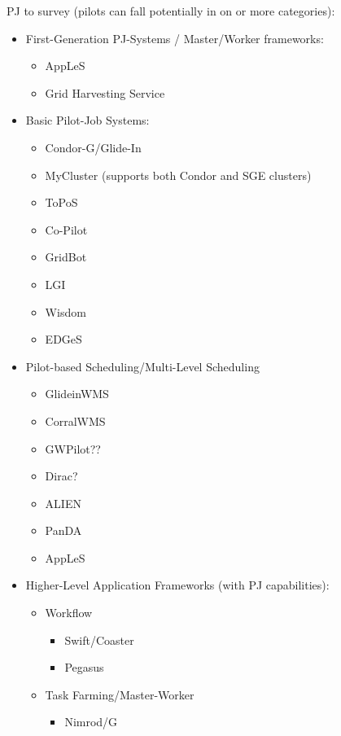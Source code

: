 \documentclass{sig-alternate}
\begin{document}
PJ to survey (pilots can fall potentially in on or more categories):
\begin{itemize}
	\item First-Generation PJ-Systems / Master/Worker frameworks:
	\begin{itemize}
		\item AppLeS
		\item Grid Harvesting Service
	\end{itemize}
	\item Basic Pilot-Job Systems: 
	\begin{itemize}
		\item Condor-G/Glide-In
		\item MyCluster (supports both Condor and SGE clusters)
		\item ToPoS 
		\item Co-Pilot
		\item GridBot~\cite{Silberstein:2009:GEB:1654059.1654071}
		\item LGI
		\item Wisdom
		\item EDGeS
	\end{itemize}
	\item Pilot-based Scheduling/Multi-Level Scheduling
	\begin{itemize}
		\item GlideinWMS~\cite{1742-6596-119-6-062044}
		\item CorralWMS
		\item GWPilot??
		\item Dirac?
        \item ALIEN
		\item PanDA  
		\item AppLeS
	\end{itemize}
	\item Higher-Level Application Frameworks (with PJ capabilities):
	\begin{itemize}
		\item Workflow
		\begin{itemize}
			\item Swift/Coaster
			\item Pegasus
		\end{itemize}
		\item Task Farming/Master-Worker
		\begin{itemize}
			\item Nimrod/G 

\end{itemize}
\end{itemize}
\end{itemize}
\end{document}
